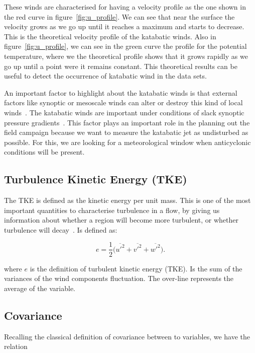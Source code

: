 \documentclass[a4paper,12pt]{article}
\begin{document}
These winds are characterised for having a velocity profile as the one shown in the red curve in figure~\ref{fig:u_profile}. We can see that near the surface the velocity grows as we go up until it reaches a maximum and starts to decrease. This is the theoretical velocity profile of the katabatic winds. Also in figure~\ref{fig:u_profile}, we can see in the green curve the profile for the potential temperature, where we the theoretical profile shows that it grows rapidly as we go up until a point were it remains constant. This theoretical results can be useful to detect the occurrence of katabatic wind in the data sets.

An important factor to highlight about the katabatic winds is that external factors like synoptic or mesoscale winds can alter or destroy this kind of local winds~\citep{stull2012introduction}. The katabatic winds are important under conditions of slack synoptic pressure gradients~\citep{manins1979katabatic}. This factor plays an important role in the planning out the field campaign because we want to measure the katabatic jet as undisturbed as possible. For this, we are looking for a meteorological window when anticyclonic conditions will be present. 

\subsection{Turbulence Kinetic Energy (TKE)}
The TKE is defined as the kinetic energy per unit mass. This is one of the most important quantities to characterise turbulence in a flow, by giving us information about whether a region will become more turbulent, or whether turbulence will decay~\citep{stull2012introduction}.  Is defined as:

\begin{equation}
    e = \frac{1}{2} \big(\overline{u'^2} + \overline{v'^2} + \overline{w'^2}\big). 
    \label{eq:tke}
\end{equation}

\noindent where $e$ is the definition of turbulent kinetic energy (TKE). Is the sum of the variances of the wind components fluctuation. The over-line represents the average of the variable. 

\subsection{Covariance}

Recalling the classical definition of covariance between to variables, we have the relation 
\end{document}
